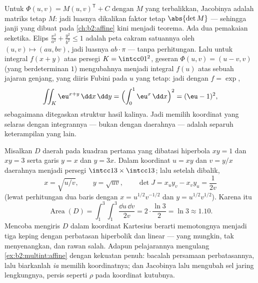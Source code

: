 \begin{example}\label{ex:b2:multint:affine}
Untuk  $\Phi(u, v) = M(u, v)^{\mathsf T} + C$ dengan
$M$ yang terbalikkan, Jacobinya adalah matriks tetap $M$:
jadi luasnya dikalikan faktor tetap $\abs{\det M}$
--- sehingga janji yang dibuat pada \cref{ch:b2:affine} kini menjadi teorema.
Ada dua pemakaian seketika. Elips $\frac{x^2}{a^2} +
\frac{y^2}{b^2} \leq 1$ adalah peta cakram satuannya oleh
$(u, v) \mapsto (au, bv)$, jadi luasnya $ab \cdot \pi$ ---
tanpa perhitungan. Lalu untuk integral $f(x + y)$ atas
persegi $K = \intcc01^2$, geseran $\Phi(u, v) = (u - v, v)$
(yang berdeterminan $1$) mengubahnya menjadi integral $f(u)$ atas sebuah
jajaran genjang, yang diiris Fubini pada $u$ yang tetap: jadi dengan $f =
\exp$,
\[
\iint_K \eu^{x+y}\,\dd x\,\dd y
= \Bigl(\int_0^1 \eu^x\,\dd x\Bigr)^2 = (\eu - 1)^2,
\]
sebagaimana ditegaskan struktur hasil kalinya. Jadi memilih koordinat
yang selaras dengan integrannya --- bukan dengan daerahnya --- adalah
separuh keterampilan yang lain.
\end{example}


\begin{example}\label{ex:b2:multint:hyperbolicregion}
Misalkan $D$ daerah pada kuadran pertama yang dibatasi
hiperbola $xy = 1$ dan $xy = 3$ serta garis $y = x$ dan
$y = 3x$. Dalam koordinat $u = xy$ dan $v = y/x$ daerahnya
menjadi persegi $\intcc13 \times \intcc13$; lalu setelah dibalik,
\[
x = \sqrt{u/v}, \qquad y = \sqrt{uv},
\qquad
\det J = x_uy_v - x_vy_u = \frac{1}{2v}
\]
(lewat perhitungan dua baris dengan $x = u^{1/2}v^{-1/2}$ dan $y =
u^{1/2}v^{1/2}$). Karena itu
\[
\operatorname{Area}(D)
= \int_1^3\!\!\int_1^3\frac{\dd u\,\dd v}{2v}
= 2\cdot\frac{\ln 3}{2} = \ln 3 \approx 1.10 .
\]
Mencoba mengiris $D$ dalam koordinat Kartesius berarti memotongnya
menjadi tiga keping dengan perbatasan hiperbolik dan linear ---
yang mungkin, tak menyenangkan, dan rawan salah. Adapun pelajarannya mengulang
\cref{ex:b2:multint:affine} dengan kekuatan penuh: bacalah
persamaan perbatasannya, lalu biarkanlah \emph{ia} memilih
koordinatnya; dan Jacobinya lalu mengubah  sel jaring
lengkungnya, persis seperti $\rho$ pada koordinat
kutubnya.
\end{example}

